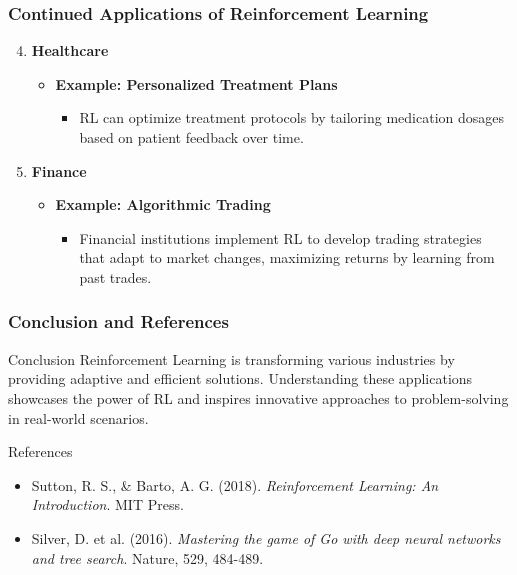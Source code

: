 \documentclass[aspectratio=169]{beamer}
\begin{document}
\begin{frame}[fragile]
    \frametitle{Continued Applications of Reinforcement Learning}
    \begin{enumerate}
        \setcounter{enumi}{3} %
        \item \textbf{Healthcare}
            \begin{itemize}
                \item \textbf{Example: Personalized Treatment Plans}
                \begin{itemize}
                    \item RL can optimize treatment protocols by tailoring medication dosages based on patient feedback over time.
                \end{itemize}
            \end{itemize}
        \item \textbf{Finance}
            \begin{itemize}
                \item \textbf{Example: Algorithmic Trading}
                \begin{itemize}
                    \item Financial institutions implement RL to develop trading strategies that adapt to market changes, maximizing returns by learning from past trades.
                \end{itemize}
            \end{itemize}
    \end{enumerate}
\end{frame}

\begin{frame}[fragile]
    \frametitle{Conclusion and References}
    \begin{block}{Conclusion}
        Reinforcement Learning is transforming various industries by providing adaptive and efficient solutions. Understanding these applications showcases the power of RL and inspires innovative approaches to problem-solving in real-world scenarios.
    \end{block}

    \begin{block}{References}
        \begin{itemize}
            \item Sutton, R. S., \& Barto, A. G. (2018). \textit{Reinforcement Learning: An Introduction}. MIT Press.
            \item Silver, D. et al. (2016). \textit{Mastering the game of Go with deep neural networks and tree search}. Nature, 529, 484-489.
        \end{itemize}
    \end{block}
\end{frame}
\end{document}
